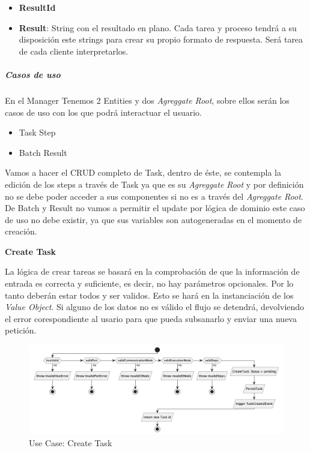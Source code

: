 \begin{itemize}
\begin{itemize}
            \item \textbf{ResultId}
            \item \textbf{Result}: String con el resultado en plano. Cada tarea y proceso tendrá a su disposición este strings para crear su propio formato de respuesta. Será tarea de cada cliente interpretarlos.
        \end{itemize}
\end{itemize}

\subparagraph{Casos de uso}

En el Manager Tenemos 2 Entities y dos \textit{Agreggate Root}, sobre ellos serán los casos de uso con los que podrá interactuar el usuario.

\begin{itemize}
    \item Task
    \subitem Step
    \item Batch
    \subitem Result
\end{itemize}

Vamos a hacer el \gls{CRUD} completo de Task, dentro de éste, se contempla la edición de los steps a través de Task ya que es su \textit{Agreggate Root} y por definición no se debe poder acceder a sus componentes si no es a través del \textit{Agreggate Root}. De Batch y Result no vamos a permitir el update por lógica de dominio este caso de uso no debe existir, ya que sus variables son autogeneradas en el momento de creación.

\textbf{Create Task}

La lógica de crear tareas se basará en la comprobación de que la información de entrada es correcta y suficiente, es decir, no hay parámetros opcionales. Por lo tanto deberán estar todos y ser validos. Esto se hará en la instanciación de los \textit{Value Object}. Si alguno de los datos no es válido el flujo se detendrá, devolviendo el error corespondiente al usario para que pueda subsanarlo y enviar una nueva petición.

\begin{figure}[H]
    \centering
    \includegraphics[height=0.2\textheight]{./part/Proyecto_ejecutivo/memoria_descriptiva/descripcionDelProyecto/manager/uml/createTaskUseCase}
    \caption{Use Case: Create Task}\label{fig:Use Case-Create Task}
\end{figure}

